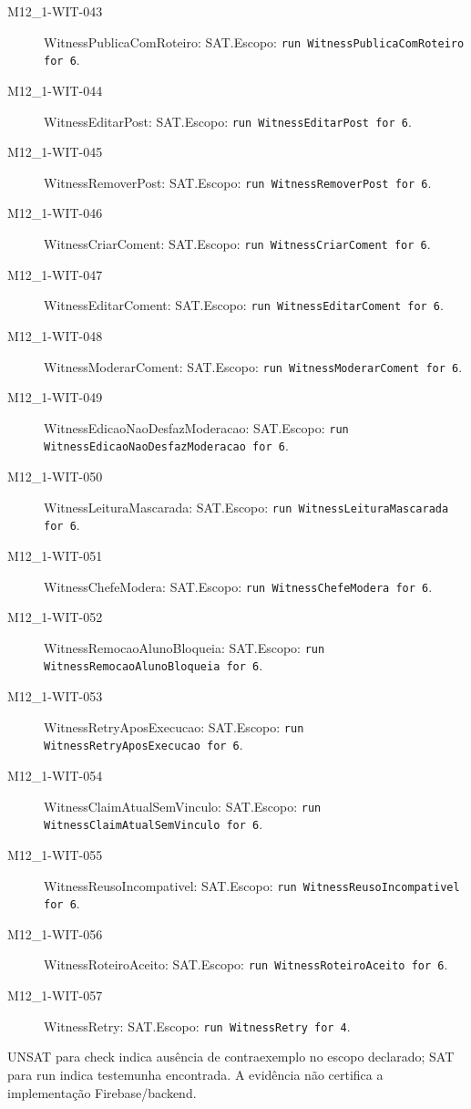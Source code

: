 \begin{description}
\item[M12\_1-WIT-043] WitnessPublicaComRoteiro: SAT.\newline Escopo: \texttt{run WitnessPublicaComRoteiro for 6}.
\item[M12\_1-WIT-044] WitnessEditarPost: SAT.\newline Escopo: \texttt{run WitnessEditarPost for 6}.
\item[M12\_1-WIT-045] WitnessRemoverPost: SAT.\newline Escopo: \texttt{run WitnessRemoverPost for 6}.
\item[M12\_1-WIT-046] WitnessCriarComent: SAT.\newline Escopo: \texttt{run WitnessCriarComent for 6}.
\item[M12\_1-WIT-047] WitnessEditarComent: SAT.\newline Escopo: \texttt{run WitnessEditarComent for 6}.
\item[M12\_1-WIT-048] WitnessModerarComent: SAT.\newline Escopo: \texttt{run WitnessModerarComent for 6}.
\item[M12\_1-WIT-049] WitnessEdicaoNaoDesfazModeracao: SAT.\newline Escopo: \texttt{run WitnessEdicaoNaoDesfazModeracao for 6}.
\item[M12\_1-WIT-050] WitnessLeituraMascarada: SAT.\newline Escopo: \texttt{run WitnessLeituraMascarada for 6}.
\item[M12\_1-WIT-051] WitnessChefeModera: SAT.\newline Escopo: \texttt{run WitnessChefeModera for 6}.
\item[M12\_1-WIT-052] WitnessRemocaoAlunoBloqueia: SAT.\newline Escopo: \texttt{run WitnessRemocaoAlunoBloqueia for 6}.
\item[M12\_1-WIT-053] WitnessRetryAposExecucao: SAT.\newline Escopo: \texttt{run WitnessRetryAposExecucao for 6}.
\item[M12\_1-WIT-054] WitnessClaimAtualSemVinculo: SAT.\newline Escopo: \texttt{run WitnessClaimAtualSemVinculo for 6}.
\item[M12\_1-WIT-055] WitnessReusoIncompativel: SAT.\newline Escopo: \texttt{run WitnessReusoIncompativel for 6}.
\item[M12\_1-WIT-056] WitnessRoteiroAceito: SAT.\newline Escopo: \texttt{run WitnessRoteiroAceito for 6}.
\item[M12\_1-WIT-057] WitnessRetry: SAT.\newline Escopo: \texttt{run WitnessRetry for 4}.
\end{description}
UNSAT para check indica ausência de contraexemplo no escopo declarado; SAT para run indica testemunha encontrada. A evidência não certifica a implementação Firebase/backend.
